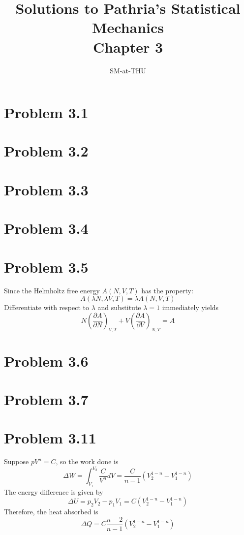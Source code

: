 \documentclass{article}
\author{SM-at-THU}
\title{\bf{Solutions to Pathria's Statistical Mechanics}\\Chapter 3}
\begin{document}
\maketitle

\section*{Problem 3.1}

\section*{Problem 3.2}

\section*{Problem 3.3}

\section*{Problem 3.4}

\section*{Problem 3.5}
	Since the Helmholtz free energy $A(N,V,T)$ has the property:
	\begin{equation*}
		A(\lambda N,\lambda V,T) = \lambda A(N,V,T)
	\end{equation*}
	Differentiate with respect to $\lambda$ and substitute $\lambda=1$ immediately yields
	\begin{equation*}
		N\left( \frac{ \partial A }{\partial N} \right)_{V,T}+V \left( \frac{ \partial A }{\partial V} \right)_{N,T} = A
	\end{equation*}

\section*{Problem 3.6}

\section*{Problem 3.7}

\section*{Problem 3.11}
	Suppose $pV^{n} = C$, so the work done is
	\begin{equation}
	\Delta W = \int^{V_{2}}_{V_{1}} \frac{C}{V^{n}} dV = \frac{C}{n-1} (V^{1-n}_{2}	 - V^{1-n}_{1})
	\end{equation}
	The energy difference is given by
	\begin{equation}
	\Delta U = p_{2}V_{2} - p_{1}V_{1} = C (V^{1-n}_{2} - V^{1-n}_{1})
	\end{equation}
	Therefore, the heat absorbed is
	\begin{equation}
	\Delta Q =  C\frac{n-2}{n-1} (V^{1-n}_{2} - V^{1-n}_{1})
	\end{equation}
\end{document}
